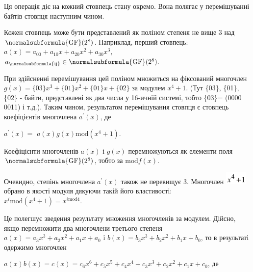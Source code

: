 \bigskip

Ця операція діє на кожний стовпець стану окремо. Вона полягає у перемішуванні
байтів стовпця наступним чином.

Кожен стовпець може бути представлений як поліном степеня не вище 3 над 
${\normalsubformula{\text{GF}}(2^{{8}})}$. Наприклад, перший стовпець:\ \ 
${a(x)=a_{{\text{00}}}+a_{{\text{10}}}x+a_{{\text{20}}}x^{{2}}+a_{{\text{30}}}x^{{3}},}$
 ${a_{{\normalsubformula{\text{ij}}}}\in
\normalsubformula{\text{GF}}(2^{{8}})\text{.}}$  


\bigskip

При  здійсненні перемішування цей поліном множиться на фіксований многочлен 
${g(x)=\{\text{03}\}x^{{3}}+\{\text{01}\}x^{{2}}+\{\text{01}\}x+\{\text{02}\}}$
за модулем  ${x^{{4}}+1}$. (Тут \{03\}, \{01\}, \{02\} -  байти, представлені
як два числа у 16-ичній системі, тобто \{03\}= (0000 0011) і т.д.). Таким
чином, результатом перемішування стовпця є стовпець коефіцієнтів многочлена 
${{a}^{'}(x)}$, де

\begin{figure}
\centering
\begin{minipage}{1.4965in}
{\centering   [Warning: Image ignored] %
 \par}
\end{minipage}
\end{figure}
{\centering
 ${{a}^{'}(x)=}$ ${a(x)g(x)\text{mod}(x^{{4}}+1)}$.
\par}

Коефіцієнти многочленів  ${a(x)}$ і  ${g(x)}$ перемножуються як елементи поля 
${\normalsubformula{\text{GF}}(2^{{8}})}$, тобто за  ${\text{mod}f(x)}$.

Очевидно, степінь многочлена  ${{a}^{'}(x)}$ також не перевищує 3. Многочлен 
\includegraphics[width=0.4307in,height=0.25in]{crypt-img/crypt-img334.png} 
обрано в якості модуля дякуючи такій його властивості: 
${x^{{i}}\text{mod}(x^{{4}}+1)=x^{{i\text{mod}4}}\text{.}}$

Це полегшує зведення результату множення многочленів за модулем. Дійсно, якщо
перемножити два многочлени третього степеня 
${a(x)=a_{{3}}x^{{3}}+a_{{2}}x^{{2}}+a_{{1}}x+a_{{0}}}$ і 
${b(x)=b_{{3}}x^{{3}}+b_{{2}}x^{{2}}+b_{{1}}x+b_{{0}}}$, то в результаті
одержимо многочлен 


${a(x)b(x)=c(x)=c_{{6}}x^{{6}}+c_{{5}}x^{{5}}+c_{{4}}x^{{4}}+c_{{3}}x^{{3}}+c_{{2}}x^{{2}}+c_{{1}}x+c_{{0}}}$,
де 

